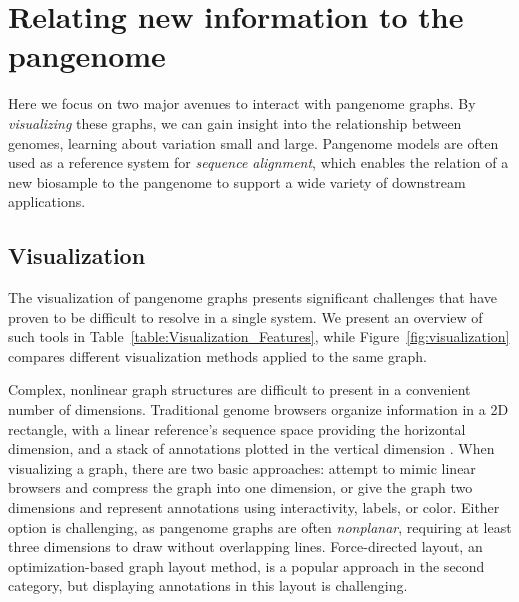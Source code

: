 \section{Relating new information to the pangenome}
\label{sec:relating}

Here we focus on two major avenues to interact with pangenome graphs.
By \emph{visualizing} these graphs, we can gain insight into the relationship between genomes, learning about variation small and large.
Pangenome models are often used as a reference system for \emph{sequence alignment}, which enables the relation of a new biosample to the pangenome to support a wide variety of downstream applications.

\subsection{Visualization}

\label{sec:viz}


The visualization of pangenome graphs presents significant challenges that have proven to be difficult to resolve in a single system.
We present an overview of such tools in Table~\ref{table:Visualization_Features}, while Figure~\ref{fig:visualization} compares different visualization methods applied to the same graph. %

Complex, nonlinear graph structures are difficult to present in a convenient number of dimensions.
Traditional genome browsers organize information in a 2D rectangle, with a linear reference's sequence space providing the horizontal dimension, and a stack of annotations plotted in the vertical dimension \cite{Haeussler_2018}.
When visualizing a graph, there are two basic approaches: attempt to mimic linear browsers and compress the graph into one dimension, or give the graph two dimensions and represent annotations using interactivity, labels, or color.
Either option is challenging, as pangenome graphs are often \emph{nonplanar}, requiring at least three dimensions to draw without overlapping lines.
Force-directed layout, an optimization-based graph layout method, is a popular approach in the second category, but displaying annotations in this layout is challenging.

